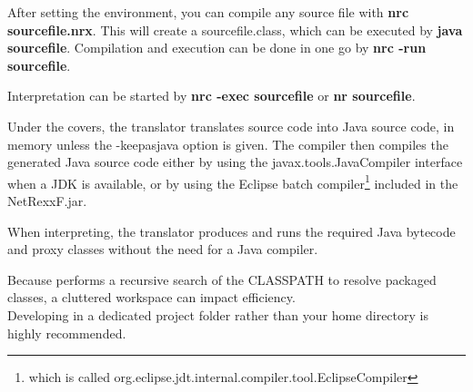After setting the environment, you can compile any \nr{} source file with \textbf{nrc sourcefile.nrx}. This will create a sourcefile.class, which can be executed by \textbf{java sourcefile}.
Compilation and execution can be done in one go by \textbf{nrc -run sourcefile}.

Interpretation can be started by \textbf{nrc -exec sourcefile} or \textbf{nr sourcefile}.

Under the covers, the translator translates \nr{} source code into Java source code, in memory unless the -keepasjava 
option is given. The compiler then compiles the generated Java source code either by using the javax.tools.JavaCompiler interface
 when a JDK is available, or by using the Eclipse batch
 compiler\footnote{which is called org.eclipse.jdt.internal.compiler.tool.EclipseCompiler} included in the NetRexxF.jar.

When interpreting, the \nr{} translator produces and runs the required Java bytecode and proxy classes without the need for a Java compiler.

Because \nr{} performs a recursive search of the CLASSPATH to resolve packaged classes, a cluttered workspace 
can impact efficiency. \\
Developing in a dedicated project folder rather than your home directory is highly recommended.

